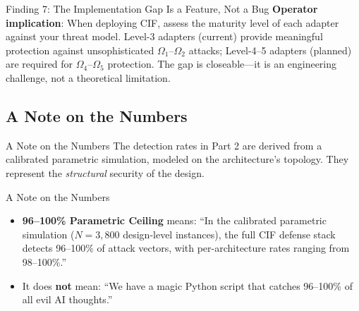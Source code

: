 \documentclass[
  ignorenonframetext,
]{beamer}
\providecommand{\tightlist}{%
  \setlength{\itemsep}{0pt}\setlength{\parskip}{0pt}}
\begin{document}
\begin{frame}[allowframebreaks]{Finding 7: The Implementation Gap Is a
Feature, Not a Bug}
\textbf{Operator implication}: When deploying CIF, assess the maturity
level of each adapter against your threat model. Level-3 adapters
(current) provide meaningful protection against unsophisticated
\(\Omega_1\)--\(\Omega_2\) attacks; Level-4--5 adapters (planned) are
required for \(\Omega_4\)--\(\Omega_5\) protection. The gap is
closeable---it is an engineering challenge, not a theoretical
limitation.
\end{frame}

\begin{frame}
\end{frame}

\subsection{A Note on the Numbers}\label{a-note-on-the-numbers}

\begin{frame}{A Note on the Numbers}
The detection rates in Part 2 are derived from a calibrated parametric
simulation, modeled on the architecture's topology. They represent the
\emph{structural} security of the design.

\end{frame}

\begin{frame}{A Note on the Numbers}
\begin{itemize}
\tightlist
\item
  \textbf{96--100\% Parametric Ceiling} means: ``In the calibrated
  parametric simulation (\(N=3{,}800\) design-level instances), the full
  CIF defense stack detects 96--100\% of attack vectors, with
  per-architecture rates ranging from 98--100\%.''
\item
  It does \textbf{not} mean: ``We have a magic Python script that
  catches 96--100\% of all evil AI thoughts.''
\end{itemize}

\end{frame}
\end{document}
